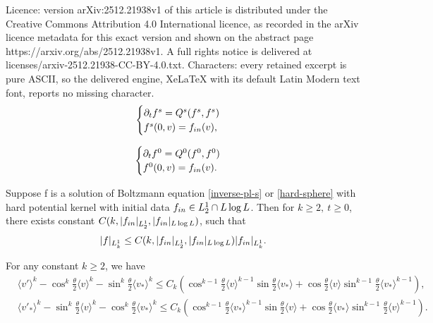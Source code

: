\documentclass[10pt,a4paper]{amsart}
\def\pa{\partial}
\def\th{\theta}
\newcommand{\beno}{\begin{eqnarray*}}
\newcommand{\beq}{\begin{equation}}
\newcommand{\eeno}{\end{eqnarray*}}
\newcommand{\eeq}{\end{equation}}
\begin{document}
Licence: version arXiv:2512.21938v1 of this article is distributed under the Creative Commons Attribution 4.0 International licence, as recorded in the arXiv licence metadata for this exact version and shown on the abstract page https://arxiv.org/abs/2512.21938v1. A full rights notice is delivered at licenses/arxiv-2512.21938-CC-BY-4.0.txt. Characters: every retained excerpt is pure ASCII, so the delivered engine, XeLaTeX with its default Latin Modern text font, reports no missing character.
\begin{equation}\label{inverse-pl-s}
\begin{cases}
\pa_t f^s=Q^s(f^s,f^s)\\
f^s(0,v)=f_{\textup{in}}(v),
\end{cases}  
\end{equation}

\begin{equation}\label{hard-sphere}
\begin{cases}
\pa_t f^0=Q^0(f^0,f^0)\\
f^0(0,v)=f_{\textup{in}}(v).
\end{cases}
\end{equation}

\begin{lem}\label{lem3.1}
    Suppose f is a solution of Boltzmann equation \eqref{inverse-pl-s} or \eqref{hard-sphere} with hard potential kernel with initial data $f_{\textup{in}}\in L^1_2\cap L\log L$. Then for $k\ge 2,\ t\ge 0$, there exists constant $C(k,|f_{\textup{in}}|_{L^1_2},|f_{\textup{in}}|_{L\log L})$, such that
    \beno
|f|_{L^1_k}\le C(k,|f_{\textup{in}}|_{L^1_2},|f_{\textup{in}}|_{L\log L})|f_{\textup{in}}|_{L^1_k}.
    \eeno
\end{lem}

\begin{lem}\label{lemma3.2}
    For any constant $k\ge2$, we have
    \beq\label{3.1}
    \begin{aligned}
&\langle v'\rangle^k-\cos^k\frac{\th}{2}\langle v\rangle^k-\sin^k\frac{\th}{2}\langle v_*\rangle^k\le C_k(\cos^{k-1}\frac{\th}{2}\langle v\rangle^{k-1}\sin\frac{\th}{2}\langle v_*\rangle+\cos\frac{\th}{2}\langle v\rangle\sin^{k-1}\frac{\th}{2}\langle v_*\rangle^{k-1}),\\
&\langle v'_*\rangle^k-\sin^k\frac{\th}{2}\langle v\rangle^k-\cos^k\frac{\th}{2}\langle v_*\rangle^k\le C_k(\cos^{k-1}\frac{\th}{2}\langle v_*\rangle^{k-1}\sin\frac{\th}{2}\langle v\rangle+\cos\frac{\th}{2}\langle v_*\rangle\sin^{k-1}\frac{\th}{2}\langle v\rangle^{k-1}).
\end{aligned}
    \eeq
\end{lem}
\end{document}

